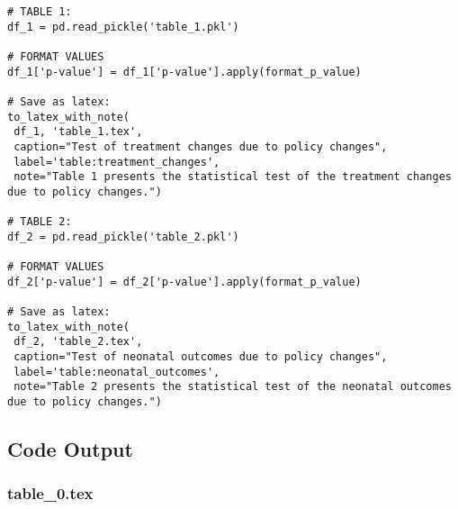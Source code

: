 \documentclass[11pt]{article}
\begin{document}
\begin{verbatim}
# TABLE 1:
df_1 = pd.read_pickle('table_1.pkl')

# FORMAT VALUES
df_1['p-value'] = df_1['p-value'].apply(format_p_value)

# Save as latex:
to_latex_with_note(
 df_1, 'table_1.tex',
 caption="Test of treatment changes due to policy changes", 
 label='table:treatment_changes',
 note="Table 1 presents the statistical test of the treatment changes due to policy changes.")

# TABLE 2:
df_2 = pd.read_pickle('table_2.pkl')

# FORMAT VALUES
df_2['p-value'] = df_2['p-value'].apply(format_p_value)

# Save as latex:
to_latex_with_note(
 df_2, 'table_2.tex',
 caption="Test of neonatal outcomes due to policy changes", 
 label='table:neonatal_outcomes',
 note="Table 2 presents the statistical test of the neonatal outcomes due to policy changes.")

\end{verbatim}



\subsection{Code Output}

\subsubsection*{table\_0.tex}
\end{document}
